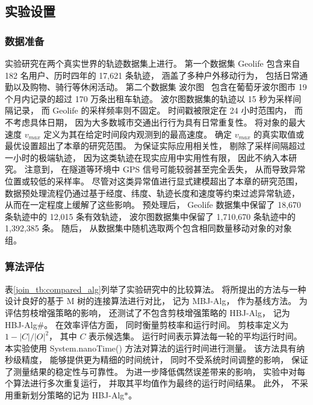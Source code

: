 \subsection{实验设置}
\subsubsection*{数据准备}
实验研究在两个真实世界的轨迹数据集上进行。 第一个数据集 Geolife  包含来自 182 名用户、历时四年的 17,621 条轨迹， 涵盖了多种户外移动行为， 包括日常通勤以及购物、骑行等休闲活动。 第二个数据集 波尔图~ 包含在葡萄牙波尔图市 19 个月内记录的超过 170 万条出租车轨迹。 波尔图数据集的轨迹以 15 秒为采样间隔记录， 而 Geolife 的采样频率则不固定。 时间戳被限定在 24 小时范围内， 而不考虑具体日期， 因为大多数城市交通出行行为具有日常重复性。 将对象的最大速度 $v_{max}$ 定义为其在给定时间段内观测到的最高速度。 确定 $v_{max}$ 的真实取值或最优设置超出了本章的研究范围。 为保证实际应用相关性， 剔除了采样间隔超过一小时的极端轨迹， 因为这类轨迹在现实应用中实用性有限， 因此不纳入本研究。 注意到， 在隧道等环境中 GPS 信号可能较弱甚至完全丢失， 从而导致异常位置或较低的采样率。 尽管对这类异常值进行显式建模超出了本章的研究范围， 数据预处理流程仍通过基于经度、纬度、轨迹长度和速度等约束过滤异常轨迹， 从而在一定程度上缓解了这些影响。 预处理后， Geolife 数据集中保留了 18,670 条轨迹中的 12,015 条有效轨迹， 波尔图数据集中保留了 1,710,670 条轨迹中的 1,392,385 条。 随后， 从数据集中随机选取两个包含相同数量移动对象的对象组。

\subsubsection*{算法评估}


表\ref{join_tb:compared_alg}列举了实验研究中的比较算法。
将所提出的方法与一种设计良好的基于 M 树的连接算法进行对比， 记为 MBJ-Alg， 作为基线方法。 为评估剪枝增强策略的影响， 还测试了不包含剪枝增强策略的 HBJ-Alg， 记为 HBJ-Alg\#。 在效率评估方面， 同时衡量剪枝率和运行时间。 剪枝率定义为 $1- |C|/|O|^2$， 其中 $C$ 表示候选集。 运行时间表示算法每一轮的平均运行时间。 本实验使用 System.nanoTime() 方法对算法的运行时间进行测量。 该方法具有纳秒级精度， 能够提供更为精细的时间统计， 同时不受系统时间调整的影响， 保证了测量结果的稳定性与可靠性。 为进一步降低偶然误差带来的影响， 实验中对每个算法进行多次重复运行， 并取其平均值作为最终的运行时间结果。 此外， 不采用重新划分策略的记为 HBJ-Alg$*$。

